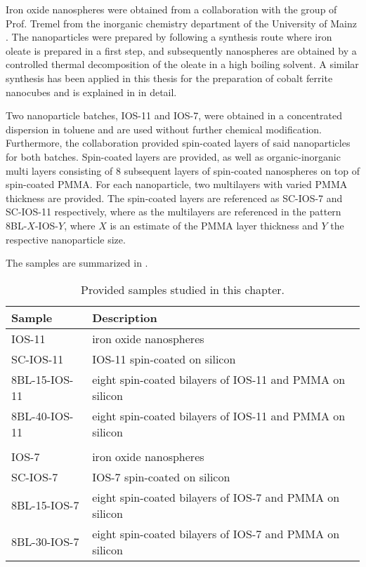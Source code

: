 \documentclass[\main/dresen_thesis.tex]{subfiles}
\begin{document}
  Iron oxide nanospheres were obtained from a collaboration with the group of Prof. Tremel from the inorganic chemistry department of the University of Mainz \cite{Wichmann_2016_Synth}.
  The nanoparticles were prepared by following a synthesis route where iron oleate is prepared in a first step, and subsequently nanospheres are obtained by a controlled thermal decomposition of the oleate in a high boiling solvent.
  A similar synthesis has been applied in this thesis for the preparation of cobalt ferrite nanocubes and is explained in  in detail.

  Two nanoparticle batches, IOS-11 and IOS-7, were obtained in a concentrated dispersion in toluene and are used without further chemical modification.
  Furthermore, the collaboration provided spin-coated layers of said nanoparticles for both batches.
  Spin-coated layers are provided, as well as organic-inorganic multi layers consisting of 8 subsequent layers of spin-coated nanospheres on top of spin-coated PMMA.
  For each nanoparticle, two multilayers with varied PMMA thickness are provided.
  The spin-coated layers are referenced as SC-IOS-7 and SC-IOS-11 respectively, where as the multilayers are referenced in the pattern 8BL-$X$-IOS-$Y$, where $X$ is an estimate of the PMMA layer thickness and $Y$ the respective nanoparticle size.

  The samples are summarized in .
  \begin{table}[!htbp]
    \centering
    \caption{\label{tab:looselyPackedNS:expMethods:samples}Provided samples studied in this chapter.}
    \begin{tabular}{ l | l }
      \textbf{Sample}  & Description \\
      \hline
      IOS-11        & iron oxide nanospheres\\
      SC-IOS-11     & IOS-11 spin-coated on silicon\\
      8BL-15-IOS-11 & eight spin-coated bilayers of IOS-11 and PMMA on silicon\\
      8BL-40-IOS-11 & eight spin-coated bilayers of IOS-11 and PMMA on silicon\\
      \\
      IOS-7         & iron oxide nanospheres\\
      SC-IOS-7      & IOS-7 spin-coated on silicon\\
      8BL-15-IOS-7  & eight spin-coated bilayers of IOS-7 and PMMA on silicon\\
      8BL-30-IOS-7  & eight spin-coated bilayers of IOS-7 and PMMA on silicon\\
      \hline
    \end{tabular}
  \end{table}
\end{document}
